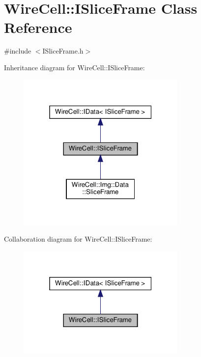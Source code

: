 \hypertarget{class_wire_cell_1_1_i_slice_frame}{}\section{Wire\+Cell\+:\+:I\+Slice\+Frame Class Reference}
\label{class_wire_cell_1_1_i_slice_frame}


{\ttfamily \#include $<$I\+Slice\+Frame.\+h$>$}



Inheritance diagram for Wire\+Cell\+:\+:I\+Slice\+Frame\+:
\nopagebreak
\begin{figure}[H]
\begin{center}
\leavevmode
\includegraphics[width=235pt]{class_wire_cell_1_1_i_slice_frame__inherit__graph}
\end{center}
\end{figure}


Collaboration diagram for Wire\+Cell\+:\+:I\+Slice\+Frame\+:
\nopagebreak
\begin{figure}[H]
\begin{center}
\leavevmode
\includegraphics[width=235pt]{class_wire_cell_1_1_i_slice_frame__coll__graph}
\end{center}
\end{figure}
